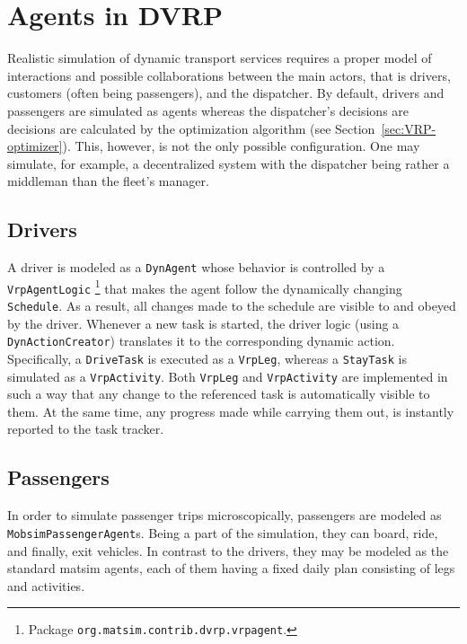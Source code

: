 \section{Agents in DVRP}
Realistic simulation of dynamic transport services requires a proper model of interactions and possible collaborations between the main actors, that is drivers, customers (often being passengers), and the dispatcher. By default, drivers and passengers are simulated as agents whereas the dispatcher's decisions are decisions are calculated by the optimization algorithm (see Section~\ref{sec:VRP-optimizer}). This, however, is not the only possible configuration. One may simulate, for example, a decentralized system with the dispatcher being rather a middleman than the fleet's manager.

\subsection{Drivers}
\label{sec:VRP-agent}
A driver is modeled as a \lstinline$DynAgent$ whose behavior is controlled by a \lstinline$VrpAgentLogic$%
\footnote{
Package \lstinline$org.matsim.contrib.dvrp.vrpagent$.
}
that makes the agent follow the dynamically changing \lstinline$Schedule$. As a result, all changes made to the schedule are visible to and obeyed by the driver. Whenever a new task is started, the driver logic (using a \lstinline$DynActionCreator$) translates it to the corresponding dynamic action. Specifically, a \lstinline$DriveTask$ is executed as a \lstinline$VrpLeg$, whereas a \lstinline$StayTask$ is simulated as a \lstinline$VrpActivity$. Both \lstinline$VrpLeg$ and \lstinline$VrpActivity$ are implemented in such a way that any change to the referenced task is automatically visible to them. At the same time, any progress made while carrying them out, is instantly reported to the task tracker.

\subsection{Passengers}
\label{sec:VRP-passengers}
In order to simulate passenger trips microscopically, passengers are modeled as \lstinline$MobsimPassengerAgent$s. Being a part of the simulation, they can board, ride, and finally, exit vehicles. In contrast to the drivers, they may be modeled as the standard \gls{matsim} agents, each of them having a fixed daily plan consisting of legs and activities.

